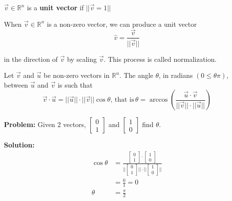 \documentclass[11pt]{article}
\theoremstyle{plain}
\theoremstyle{remark}
\theoremstyle{plain}
\newcommand{\bd}{\textbf}
\newcommand{\rn}{\mathbb{R}}
\begin{document}
\begin{tcolorbox}[colback=green!5!white,colframe=green!75!black,title=Definition]
    $\overrightarrow{v} \in \rn^n$ is a \bd{unit vector} if $||\overrightarrow{v} = 1||$
\end{tcolorbox} 

\begin{tcolorbox}[colback=green!5!white,colframe=green!75!black,title=Definition]
    When $\overrightarrow{v}\in \rn^n$ is a non-zero vector, we can produce a unit vector
    \[\hat{v} = \frac{\overrightarrow{v}}{||\overrightarrow{v}||}\]

    in the direction of $\overrightarrow{v}$ by scaling $\overrightarrow{v}$. This process is called normalization.
\end{tcolorbox} 

\begin{tcolorbox}[colback=green!5!white,colframe=green!75!black,title=Definition]
    Let $\overrightarrow{v}$ and $\overrightarrow{u}$ be non-zero vectors in $\rn^n$. The angle $\theta$, in radians $(0\leq \theta\pi)$, between $\overrightarrow{u}$
    and $\overrightarrow{v}$ is such that \[\overrightarrow{v}\cdot\overrightarrow{u} = ||\overrightarrow{u}||\cdot||\overrightarrow{v}||\cos\theta, \,\text{that is}\,\theta = \arccos(\frac{\overrightarrow{u}\cdot\overrightarrow{v}}{||\overrightarrow{v}||\cdot||\overrightarrow{u}||})\]
\end{tcolorbox} 


\begin{tcolorbox}[colback=magenta!5!white,colframe = magenta!75!black,title=Example]
    \bd{Problem:} Given 2 vectors, $\begin{bmatrix}
        0\\1
    \end{bmatrix}$ and $\begin{bmatrix}
        1\\0
    \end{bmatrix}$ find $\theta$.

    \bd{Solution:} \\

   \begin{align*}
       \cos\theta &= \frac{\begin{bmatrix}
           0\\1
       \end{bmatrix}\cdot \begin{bmatrix}
           1\\0
       \end{bmatrix}}{||\begin{bmatrix}
           0\\1
       \end{bmatrix}||\cdot||\begin{bmatrix}
           1\\0
       \end{bmatrix}||}\\
       &=\frac{0}{1} = 0\\
       \theta&=\frac{\pi}{2}
   \end{align*}
\end{tcolorbox} 
\end{document}
